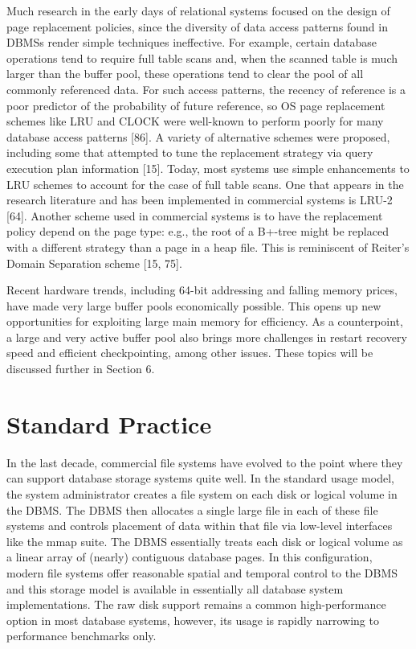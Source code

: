 \documentclass[b5paper,11pt,twoside,openright]{book}
\begin{document}
Much research in the early days of relational systems focused on the
design of page replacement policies, since the diversity of data access
patterns found in DBMSs render simple techniques ineffective. For
example, certain database operations tend to require full table scans
and, when the scanned table is much larger than the buffer pool, these
operations tend to clear the pool of all commonly referenced data. For
such access patterns, the recency of reference is a poor predictor of
the probability of future reference, so OS page replacement schemes like
LRU and CLOCK were well-known to perform poorly for many database access
patterns {[}86{]}. A variety of alternative schemes were proposed,
including some that attempted to tune the replacement strategy via query
execution plan information {[}15{]}. Today, most systems use simple
enhancements to LRU schemes to account for the case of full table scans.
One that appears in the research literature and has been implemented in
commercial systems is LRU-2 {[}64{]}. Another scheme used in commercial
systems is to have the replacement policy depend on the page type: e.g.,
the root of a B+-tree might be replaced with a different strategy than a
page in a heap file. This is reminiscent of Reiter's Domain Separation
scheme {[}15, 75{]}.

Recent hardware trends, including 64-bit addressing and falling memory
prices, have made very large buffer pools economically possible. This
opens up new opportunities for exploiting large main memory for
efficiency. As a counterpoint, a large and very active buffer pool also
brings more challenges in restart recovery speed and efficient
checkpointing, among other issues. These topics will be discussed
further in Section 6.

\hypertarget{standard-practice-3}{%
\section{Standard Practice}\label{standard-practice-3}}

In the last decade, commercial file systems have evolved to the point
where they can support database storage systems quite well. In the
standard usage model, the system administrator creates a file system on
each disk or logical volume in the DBMS. The DBMS then allocates a
single large file in each of these file systems and controls placement
of data within that file via low-level interfaces like the mmap suite.
The DBMS essentially treats each disk or logical volume as a linear
array of (nearly) contiguous database pages. In this configuration,
modern file systems offer reasonable spatial and temporal control to the
DBMS and this storage model is available in essentially all database
system implementations. The raw disk support remains a common
high-performance option in most database systems, however, its usage is
rapidly narrowing to performance benchmarks only.
\end{document}

